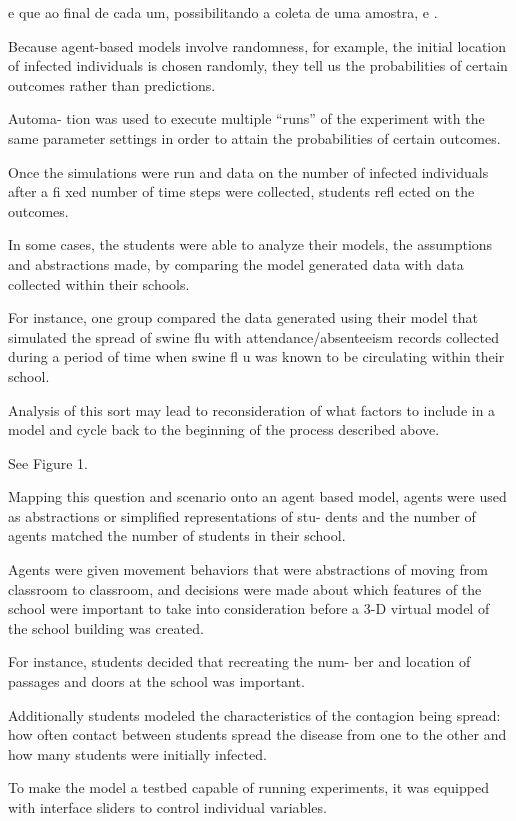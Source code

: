 e que ao final de cada um, possibilitando a coleta de uma amostra, e .



Because agent-based models involve randomness, for example, the initial location of infected individuals is chosen randomly, they tell us the probabilities of certain outcomes rather than predictions.

Automa- tion was used to execute multiple “runs” of the experiment with the same parameter settings in order to attain the probabilities of certain outcomes.

Once the simulations were run and data on the number of infected individuals after a fi xed number of time steps were collected, students refl ected on the outcomes.

In some cases, the students were able to analyze their models, the assumptions and abstractions made, by comparing the model generated data with data collected within their schools.

For instance, one group compared the data generated using their model that simulated the spread of swine flu with attendance/absenteeism records collected during a period of time when swine fl u was known to be circulating within their school.

Analysis of this sort may lead to reconsideration of what factors to include in a model and cycle back to the beginning of the process described above.

See Figure 1.

Mapping this question and scenario onto an agent based model, agents were used as abstractions or simplified representations of stu- dents and the number of agents matched the number of students in their school.

Agents were given movement behaviors that were abstractions of moving from classroom to classroom, and decisions were made about which features of the school were important to take into consideration before a 3-D virtual model of the school building was created.

For instance, students decided that recreating the num- ber and location of passages and doors at the school was important.

Additionally students modeled the characteristics of the contagion being spread: how often contact between students spread the disease from one to the other and how many students were initially infected.

To make the model a testbed capable of running experiments, it was equipped with interface sliders to control individual variables.

